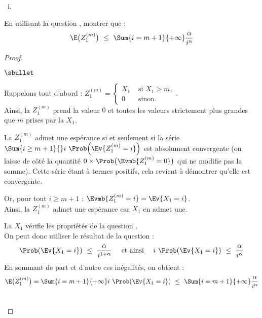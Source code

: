 \begin{liste}{\ i.}
\item En utilisant la question , montrer que :
  \[
  \E\big(Z_{1}^{(m)} \big) \ \leq \ \Sum{i = m + 1}{+ \infty}
  \dfrac{\alpha}{i^{\alpha}}
  \]
  
  \begin{proof}~%
    \begin{noliste}{$\sbullet$}
    \item Rappelons tout d'abord : $Z_{1}^{(m)} = %
      \left\{
        \begin{array}{cl}
          X_{1} & \text{ si } X_{1} > m, \\
          0 & \text{ sinon}.
        \end{array}
      \right.$.\\
      Ainsi, la \var $Z_{1}^{(m)}$ prend la valeur $0$ et toutes les
      valeurs strictement plus grandes que $m$ prises par la \var
      $X_1$. %

    \item La \var $Z_{1}^{(m)}$ admet une espérance si et seulement si
      la série $\Sum{i \geq m+1}{} i \ \Prob\Big(\Ev{Z_{1}^{(m)} = i}
      \Big)$ est absolument convergente (on laisse de côté la quantité
      $0 \times \Prob\big(\Evmb{Z_{1}^{(m)} = 0}\big)$ qui ne modifie pas la
      somme). Cette série étant à termes positifs, cela revient à
      démontrer qu'elle est convergente.

    \item Or, pour tout $i \geq m+1$ : $\Evmb{Z_{1}^{(m)} = i} =
      \Ev{X_1 = i}$.\\
      Ainsi, la \var $Z_{1}^{(m)}$ admet une espérance car $X_1$ en
      admet une.

    \item La \var $X_1$ vérifie les propriétés de la question
      .\\
      On peut donc utiliser le résultat de la question 
      :
      \[
      \Prob(\Ev{X_1 = i}) \ \leq \ \dfrac{\alpha}{i^{1+\alpha}} \quad
      \text{ et ainsi } \quad i \ \Prob(\Ev{X_1 = i}) \ \leq \
      \dfrac{\alpha}{i^{\alpha}}
      \]
      En sommant de part et d'autre ces inégalités, on obtient :
      \[
      \E\big(Z_{1}^{(m)} \big) = \Sum{i = m+1}{+\infty} i \
      \Prob(\Ev{X_1 = i}) \ \leq \ \Sum{i = m+1}{+\infty}
      \dfrac{\alpha}{i^{\alpha}}
      \]
    \end{noliste}
    ~\\[-1cm]
  \end{proof}



\end{liste}
